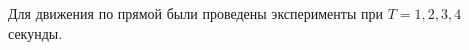 %			




Для движения по прямой были проведены эксперименты при $ T = 1, 2, 3, 4 $ секунды.


%


%

